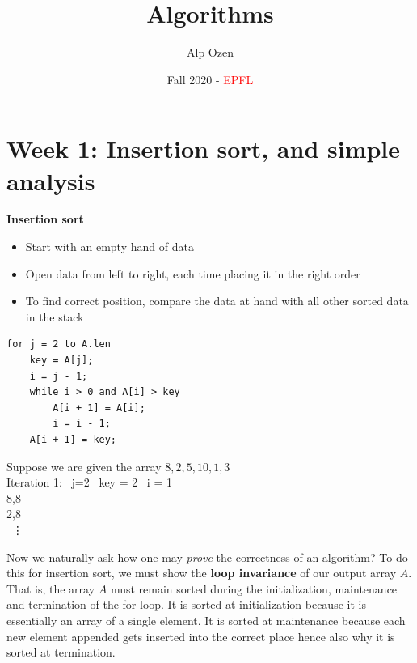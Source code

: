 \documentclass[titlepage]{article}
\title{\textbf{Algorithms}}
\author{Alp Ozen}
\date{Fall 2020 - \textcolor{red}{EPFL}}
\numberwithin{equation}{subsection}
\begin{document}
\maketitle
\tableofcontents

\clearpage

\section{Week 1: Insertion sort, and simple analysis}

\textbf{Insertion sort}

\begin{tcolorbox}
\begin{itemize}
  \item Start with an empty hand of data
  \item Open data from left to right, each time placing it in the right order
  \item To find correct position, compare the data at hand with all other sorted data in the stack 
\end{itemize}
\end{tcolorbox}

\begin{cs}
\begin{verbatim}
for j = 2 to A.len
    key = A[j];
    i = j - 1; 
    while i > 0 and A[i] > key 
        A[i + 1] = A[i];
        i = i - 1;
    A[i + 1] = key;
\end{verbatim}

\end{cs}

\begin{example}
Suppose we are given the array $8,2,5,10,1,3$
\\

Iteration 1:
\
j=2 \ key = 2 \ i = 1
\\

8,8
\\

2,8
\\

\ \vdots
\end{example}

Now we naturally ask how one may \textit{prove} the correctness of an algorithm? To do this for insertion sort, we must show the \textbf{loop invariance} of our output array $A$. That is, the array $A$ must remain sorted during the initialization, maintenance and termination of the for loop. It is sorted at initialization because it is essentially an array of a single element. It is sorted at maintenance because each new element appended gets inserted into the correct place hence also why it is sorted at termination. 
\\
\end{document}
